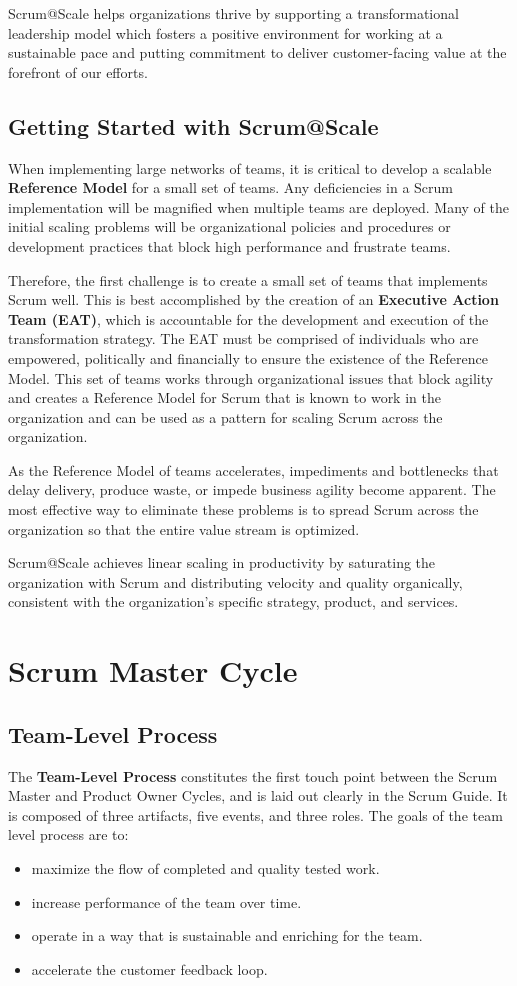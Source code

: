 \documentclass[12pt,a4paper,parskip=full]{scrartcl}
\begin{document}
Scrum@Scale helps organizations thrive by supporting a
transformational leadership model which fosters a positive environment for
working at a sustainable pace and putting commitment to deliver
customer-facing value at the forefront of our efforts.

\subsection{Getting Started with Scrum@Scale}
When implementing large networks of teams, it is critical to develop a
scalable \textbf{Reference Model} for a small set of teams. Any
deficiencies in a Scrum implementation will be magnified when multiple
teams are deployed. Many of the initial scaling problems will be organizational 
policies and procedures or development practices that block high performance and frustrate 
teams. 

Therefore, the first challenge is to create a small set of teams that
implements Scrum well.  This is best accomplished by the creation of an 
\textbf{Executive Action Team (EAT)}, which is accountable for the development and 
execution of the transformation strategy.  The EAT must be comprised of individuals 
who are empowered, politically and financially to ensure the existence of the
Reference Model.  This set of teams works through organizational
issues that block agility and creates a Reference Model for Scrum that is
known to work in the organization and can be used as a pattern for scaling
Scrum across the organization.

As the Reference Model of teams accelerates, impediments and bottlenecks
that delay delivery, produce waste, or impede business agility become
apparent. The most effective way to eliminate these problems is to spread
Scrum across the organization so that the entire value stream is optimized.

Scrum@Scale achieves linear scaling in productivity by saturating the
organization with Scrum and distributing velocity and quality organically,
consistent with the organization's specific strategy, product, and services.

\section{Scrum Master Cycle}
\subsection{Team-Level Process}
The \textbf{Team-Level Process} constitutes the first touch point between the Scrum Master and Product Owner Cycles, and is laid out clearly in the Scrum Guide. It
is composed of three artifacts, five events, and three roles. The goals of
the team level process are to:
\begin{itemize}
\item maximize the flow of completed and quality tested work.
\item increase performance of the team over time.
\item operate in a way that is sustainable and enriching for the team.
\item accelerate the customer feedback loop.
\end{itemize}
\end{document}
